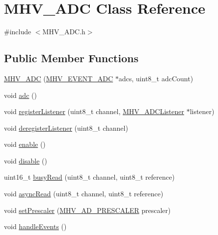 \hypertarget{class_m_h_v___a_d_c}{
\section{\-M\-H\-V\-\_\-\-A\-D\-C \-Class \-Reference}
\label{class_m_h_v___a_d_c}
}


{\ttfamily \#include $<$\-M\-H\-V\-\_\-\-A\-D\-C.\-h$>$}

\subsection*{\-Public \-Member \-Functions}
\begin{DoxyCompactItemize}
\item 
\hyperlink{class_m_h_v___a_d_c_a99020253bc4e308715108a37ff317471}{\-M\-H\-V\-\_\-\-A\-D\-C} (\hyperlink{_m_h_v___a_d_c_8h_a21c373c52cc2836a0010981c9b63d1f9}{\-M\-H\-V\-\_\-\-E\-V\-E\-N\-T\-\_\-\-A\-D\-C} $\ast$adcs, uint8\-\_\-t adc\-Count)
\item 
void \hyperlink{class_m_h_v___a_d_c_a62548b3bbb7b2e916a5adba15d40723f}{adc} ()
\item 
void \hyperlink{class_m_h_v___a_d_c_aa05d2f83cd5a2cd1efc87a396dc25b03}{register\-Listener} (uint8\-\_\-t channel, \hyperlink{class_m_h_v___a_d_c_listener}{\-M\-H\-V\-\_\-\-A\-D\-C\-Listener} $\ast$listener)
\item 
void \hyperlink{class_m_h_v___a_d_c_afccc455d24da99698a91b10710fcaf36}{deregister\-Listener} (uint8\-\_\-t channel)
\item 
void \hyperlink{class_m_h_v___a_d_c_a5578b8f74a62fbf4207dd10a6d3da4f0}{enable} ()
\item 
void \hyperlink{class_m_h_v___a_d_c_ad7eb5acfd0484c0213dcfb6851de2052}{disable} ()
\item 
uint16\-\_\-t \hyperlink{class_m_h_v___a_d_c_ad0b41df30ca6f91fb79c64dd85f24d78}{busy\-Read} (uint8\-\_\-t channel, uint8\-\_\-t reference)
\item 
void \hyperlink{class_m_h_v___a_d_c_a4b3f1fb04a289201287c38ef57929fb1}{async\-Read} (uint8\-\_\-t channel, uint8\-\_\-t reference)
\item 
void \hyperlink{class_m_h_v___a_d_c_a29943f22942857e41e6c060ec7238765}{set\-Prescaler} (\hyperlink{_m_h_v___a_d_8h_a1c5416b19545e0c8422dbe381d6df18f}{\-M\-H\-V\-\_\-\-A\-D\-\_\-\-P\-R\-E\-S\-C\-A\-L\-E\-R} prescaler)
\item 
void \hyperlink{class_m_h_v___a_d_c_a431d2be95d566a7595691a0ecb40ba54}{handle\-Events} ()
\end{DoxyCompactItemize}
